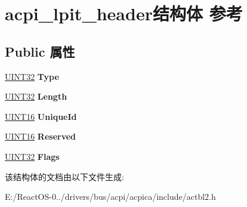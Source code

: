 \hypertarget{structacpi__lpit__header}{}\section{acpi\+\_\+lpit\+\_\+header结构体 参考}
\label{structacpi__lpit__header}
\subsection*{Public 属性}
\begin{DoxyCompactItemize}
\item 
\mbox{\label{structacpi__lpit__header_a1c5b66b6b82f8f609f644037d9e6025c}} 
\hyperlink{_processor_bind_8h_ae1e6edbbc26d6fbc71a90190d0266018}{U\+I\+N\+T32} {\bfseries Type}
\item 
\mbox{\label{structacpi__lpit__header_a769f116aa2096b4ffb44e6eda85e9b56}} 
\hyperlink{_processor_bind_8h_ae1e6edbbc26d6fbc71a90190d0266018}{U\+I\+N\+T32} {\bfseries Length}
\item 
\mbox{\label{structacpi__lpit__header_af3bab41de8d24ec1e436f5fc7ff4c63e}} 
\hyperlink{_processor_bind_8h_a09f1a1fb2293e33483cc8d44aefb1eb1}{U\+I\+N\+T16} {\bfseries Unique\+Id}
\item 
\mbox{\label{structacpi__lpit__header_ad1707fbac9710310cd1d9b3e3fcfac66}} 
\hyperlink{_processor_bind_8h_a09f1a1fb2293e33483cc8d44aefb1eb1}{U\+I\+N\+T16} {\bfseries Reserved}
\item 
\mbox{\label{structacpi__lpit__header_a95d130c4015907975242c6f177077d5d}} 
\hyperlink{_processor_bind_8h_ae1e6edbbc26d6fbc71a90190d0266018}{U\+I\+N\+T32} {\bfseries Flags}
\end{DoxyCompactItemize}


该结构体的文档由以下文件生成\+:\begin{DoxyCompactItemize}
\item 
E\+:/\+React\+O\+S-\/0../drivers/bus/acpi/acpica/include/actbl2.\+h\end{DoxyCompactItemize}
